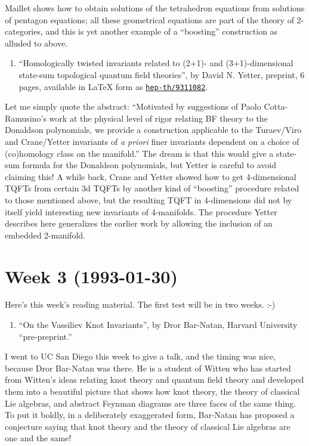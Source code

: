 \documentclass{article}
\def\tightlist{}
\begin{document}
Maillet shows how to obtain solutions of the tetrahedron equations from
solutions of pentagon equations; all these geometrical equations are
part of the theory of 2-categories, and this is yet another example of a
``boosting'' construction as alluded to above.

\begin{enumerate}
\def\labelenumi{\arabic{enumi})}
\setcounter{enumi}{4}
\tightlist
\item
  ``Homologically twisted invariants related to (2+1)- and
  (3+1)-dimensional state-sum topological quantum field theories'', by
  David N. Yetter, preprint, 6 pages, available in LaTeX form as
  \href{http://xxx.lanl.gov/abs/hep-th/9311082}{\texttt{hep-th/9311082}}.
\end{enumerate}

Let me simply quote the abstract: ``Motivated by suggestions of Paolo
Cotta-Ramusino's work at the physical level of rigor relating BF theory
to the Donaldson polynomials, we provide a construction applicable to
the Turaev/Viro and Crane/Yetter invariants of \emph{a priori} finer
invariants dependent on a choice of (co)homology class on the
manifold.'' The dream is that this would give a state-sum formula for
the Donaldson polynomials, but Yetter is careful to avoid claiming this!
A while back, Crane and Yetter showed how to get 4-dimensional TQFTs
from certain 3d TQFTs by another kind of ``boosting'' procedure related
to those mentioned above, but the resulting TQFT in 4-dimensions did not
by itself yield interesting new invariants of 4-manifolds. The procedure
Yetter describes here generalizes the earlier work by allowing the
inclusion of an embedded 2-manifold.
\hypertarget{week-3-1993-01-30}{%
\section{Week 3 (1993-01-30)}\label{week-3-1993-01-30}}

Here's this week's reading material. The first test will be in two
weeks. :-)

\begin{enumerate}
\def\labelenumi{\arabic{enumi})}
\tightlist
\item
  ``On the Vassiliev Knot Invariants'', by Dror Bar-Natan, Harvard
  University ``pre-preprint.''
\end{enumerate}

I went to UC San Diego this week to give a talk, and the timing was
nice, because Dror Bar-Natan was there. He is a student of Witten who
has started from Witten's ideas relating knot theory and quantum field
theory and developed them into a beautiful picture that shows how knot
theory, the theory of classical Lie algebras, and abstract Feynman
diagrams are three faces of the same thing. To put it boldly, in a
deliberately exaggerated form, Bar-Natan has proposed a conjecture
saying that knot theory and the theory of classical Lie algebras are one
and the same!
\end{document}
